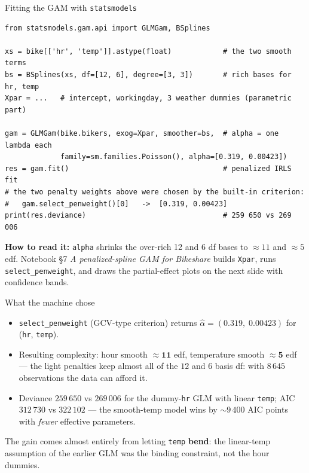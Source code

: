 \documentclass[aspectratio=169,11pt]{beamer}
\begin{document}
\begin{frame}[fragile]{Fitting the GAM with \texttt{statsmodels}}
\begin{lstlisting}
from statsmodels.gam.api import GLMGam, BSplines

xs = bike[['hr', 'temp']].astype(float)            # the two smooth terms
bs = BSplines(xs, df=[12, 6], degree=[3, 3])       # rich bases for hr, temp
Xpar = ...   # intercept, workingday, 3 weather dummies (parametric part)

gam = GLMGam(bike.bikers, exog=Xpar, smoother=bs,  # alpha = one lambda each
             family=sm.families.Poisson(), alpha=[0.319, 0.00423])
res = gam.fit()                                    # penalized IRLS fit
# the two penalty weights above were chosen by the built-in criterion:
#   gam.select_penweight()[0]   ->  [0.319, 0.00423]
print(res.deviance)                                # 259 650 vs 269 006
\end{lstlisting}
  \begin{labnote}
    \textbf{How to read it:} \texttt{alpha} shrinks the over-rich 12 and 6 df
    bases to $\approx 11$ and $\approx 5$ edf. Notebook \S 7 \emph{A penalized-spline GAM for
    Bikeshare} builds \texttt{Xpar}, runs \texttt{select\_penweight}, and draws the
    partial-effect plots on the next slide with confidence bands.
  \end{labnote}
\end{frame}

\begin{frame}{What the machine chose}
  \begin{numexample}
    \begin{itemize}
      \item \texttt{select\_penweight} (GCV-type criterion) returns
            $\hat\alpha = (0.319,\; 0.00423)$ for (\texttt{hr}, \texttt{temp}).
      \item Resulting complexity: hour smooth $\approx \mathbf{11}$ edf, temperature
            smooth $\approx \mathbf{5}$ edf --- the light penalties keep almost all of
            the $12$ and $6$ basis df: with $8\,645$ observations the data can afford it.
      \item Deviance $259\,650$ vs $269\,006$ for the dummy-\texttt{hr} GLM with linear
            \texttt{temp}; AIC $312\,730$ vs $322\,102$ --- the smooth-temp model wins
            by $\sim\!9\,400$ AIC points with \emph{fewer} effective parameters.
    \end{itemize}
  \end{numexample}
  \begin{takeaway}
    The gain comes almost entirely from letting \texttt{temp} \textbf{bend}: the
    linear-temp assumption of the earlier GLM was the binding constraint, not the
    hour dummies.
  \end{takeaway}
\end{frame}
\end{document}
